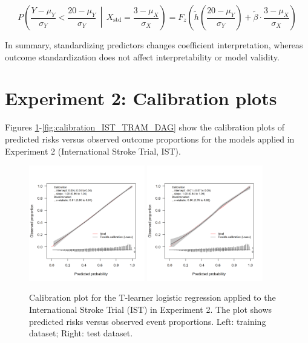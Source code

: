 \[
P\left(\frac{Y - \mu_Y}{\sigma_Y} < \frac{20 - \mu_Y}{\sigma_Y} \,\middle|\, X_{\text{std}} = \frac{3 - \mu_X}{\sigma_X} \right)
= F_z\left(\tilde{h}\left(\frac{20 - \mu_Y}{\sigma_Y}\right) + \tilde{\beta} \cdot \frac{3 - \mu_X}{\sigma_X} \right)
\]


In summary, standardizing predictors changes coefficient interpretation, whereas outcome standardization does not affect interpretability or model validity.






\section{Experiment 2: Calibration plots} \label{sec:calibrations_experiment2}

Figures \ref{fig:calibration_IST_glm}-\ref{fig:calibration_IST_TRAM_DAG} show the calibration plots of predicted risks versus observed outcome proportions for the models applied in Experiment 2 (International Stroke Trial, IST).



\begin{figure}[htbp]
\centering
\includegraphics[width=0.45\textwidth]{img/results_IST/glm_tlearner_train_calibration_plot.png}
\includegraphics[width=0.45\textwidth]{img/results_IST/glm_tlearner_test_calibration_plot.png}
\caption{Calibration plot for the T-learner logistic regression applied to the International Stroke Trial (IST) in Experiment 2. The plot shows predicted risks versus observed event proportions. Left: training dataset; Right: test dataset.}
\label{fig:calibration_IST_glm}
\end{figure}


